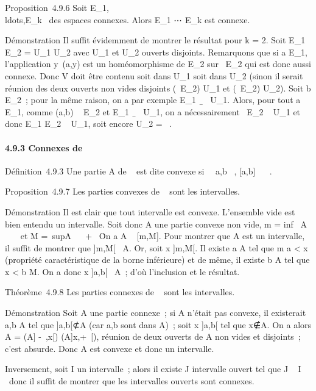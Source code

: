 \documentclass[]{article}
\begin{document}
Proposition~4.9.6 Soit
E_1,\\ldots,E_k~
des espaces connexes. Alors E_1 \times⋯ \times
E_k est connexe.

Démonstration Il suffit évidemment de montrer le résultat pour k = 2.
Soit E_1 \times E_2 = U_1 \cup U_2 avec
U_1 et U_2 ouverts disjoints. Remarquons que si a \in
E_1, l'application y\mapsto~(a,y) est un
homéomorphisme de E_2 sur \a\
\times E_2 qui est donc aussi connexe. Donc V doit être contenu soit
dans U_1 soit dans U_2 (sinon il serait réunion des
deux ouverts non vides disjoints (\a\
\times E_2) \bigcap U_1 et (\a\
\times E_2) \bigcap U_2). Soit b \in E_2~; pour la même
raison, on a par exemple E_1
\times\b\ \subset~ U_1. Alors, pour tout
a \in E_1, comme (a,b) \in\a\ \times
E_2 et E_1 \times\b\ \subset~
U_1, on a nécessairement \a\
\times E_2 \subset~ U_1 et donc E_1 \times E_2 \subset~
U_1, soit encore U_2 = \varnothing~.

\paragraph{4.9.3 Connexes de ~}

Définition~4.9.3 Une partie A de ~ est dite convexe si
\forall~~a,b \in {}~, [a,b] \subset~ ~.

Proposition~4.9.7 Les parties convexes de ~ sont les intervalles.

Démonstration Il est clair que tout intervalle est convexe. L'ensemble
vide est bien entendu un intervalle. Soit donc A une partie convexe non
vide, m = inf~ A \in \mathbb{R}~
\cup\-\infty~\ et M =\
supA \in {}~ \cup\ + \infty~\. On a A \subset~
[m,M]. Pour montrer que A est un intervalle, il suffit de montrer
que ]m,M[\subset~ A. Or, soit x \in]m,M[. Il existe a \in A tel que m \leq a
< x (propriété caractéristique de la borne inférieure) et de
même, il existe b \in A tel que x < b \leq M. On a donc x
\in]a,b[\subset~ A~; d'où l'inclusion et le résultat.

Théorème~4.9.8 Les parties connexes de \mathbb{R}~ sont les intervalles.

Démonstration Soit A une partie connexe~; si A n'était pas convexe, il
existerait a,b \in A tel que ]a,b[⊄A (car a,b sont dans A)~; soit x
\in]a,b[ tel que x∉A. On a alors A = (A\bigcap]
-\infty~,x[) \cup (A\bigcap]x,+\infty~[), réunion de deux ouverts de A non vides et
disjoints~; c'est absurde. Donc A est convexe et donc un intervalle.

Inversement, soit I un intervalle~; alors il existe J intervalle ouvert
tel que J \subset~ I \subset~\overlineJ donc il suffit de montrer
que les intervalles ouverts sont connexes.
\end{document}
